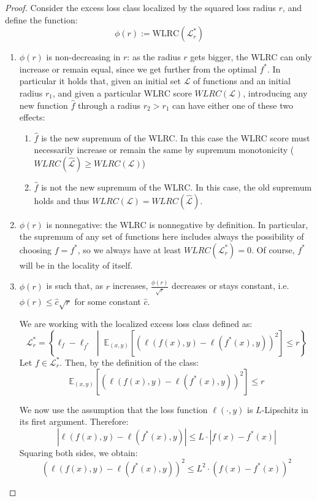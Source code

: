 \documentclass{article}
\newtheorem{proof}{Proof}
\begin{document}
\begin{proof}
Consider the excess loss class localized by the squared loss 
radius $r$, and define the function:
\[
\phi(r) := \text{WLRC}(\mathcal{L}_r^*)
\]
\begin{enumerate}
    \item $\phi(r) $  is non-decreasing in $r$:  as the radius $r$ gets bigger, the WLRC can only increase or remain equal, since we get further from the optimal
    $f^*$. In particular it holds that, given an initial set $\mathcal{L}$ of functions and an initial radius $r_1$, and given a particular WLRC score $WLRC(\mathcal{L})$, introducing any new function $\hat{f}$ through a radius $r_2 > r_1$ can have either one of these two effects: 
    \begin{enumerate}
        \item $\hat{f}$ is the new supremum of the WLRC. In this case the WLRC score must necessarily increase or remain the same by supremum monotonicity ($WLRC(\hat{\mathcal{L}}) \geq WLRC(\mathcal{L})$)
        \item $\hat{f}$ is not the new supremum of the WLRC. In this case, the old supremum holds and thus $WLRC(\mathcal{L}) = WLRC(\hat{\mathcal{L}})$.
    \end{enumerate}
    \item $\phi(r)$ is nonnegative: the WLRC is nonnegative by definition. In particular, the supremum of any set of functions here includes always the possibility of choosing $f=f^*$, so we always have at least $WLRC(\mathcal{L}_r^*)=0$. Of course, $f^*$ will be in the locality of itself.
    \item $\phi(r)$ is such that, as $r$ increases, $\frac{\phi(r)}{\sqrt{r}}$ decreases or stays constant, i.e. $\phi(r) \leq \hat{c}\sqrt{r}$ for some constant $\hat{c}$.

    We are working with the localized excess loss class defined as:
    \[
    \mathcal{L}_r^* = \left\{ \ell_f - \ell_{f^*} \;\middle|\; \mathbb{E}_{(x, y)}\left[ \left( \ell(f(x), y) - \ell(f^*(x), y) \right)^2 \right] \leq r \right\}
    \]
    Let \( f \in \mathcal{L}_r^* \). Then, by the definition of the class:
    \[
    \mathbb{E}_{(x, y)}\left[ \left( \ell(f(x), y) - \ell(f^*(x), y) \right)^2 \right] \leq r
    \]
    
    We now use the assumption that the loss function \( \ell(\cdot, y) \) is \( L \)-Lipschitz in its first argument. Therefore:
    \[
    \left| \ell(f(x), y) - \ell(f^*(x), y) \right| \leq L \cdot \left| f(x) - f^*(x) \right|
    \]
    Squaring both sides, we obtain:
    \[
    \left( \ell(f(x), y) - \ell(f^*(x), y) \right)^2 \leq L^2 \cdot \left( f(x) - f^*(x) \right)^2
    \]
    

\end{enumerate}
\end{proof}
\end{document}
